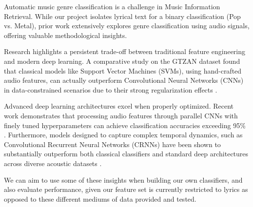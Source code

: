 Automatic music genre classification is a challenge in Music Information Retrieval. While our project isolates lyrical text for a binary classification (Pop vs. Metal), prior work extensively explores genre classification using audio signals, offering valuable methodological insights.

Research highlights a persistent trade-off between traditional feature engineering and modern deep learning. A comparative study on the GTZAN dataset found that classical models like Support Vector Machines (SVMs), using hand-crafted audio features, can actually outperform Convolutional Neural Networks (CNNs) in data-constrained scenarios due to their strong regularization effects \citep{mishra2025musicgenreclassificationusing}.

Advanced deep learning architectures excel when properly optimized. Recent work demonstrates that processing audio features through parallel CNNs with finely tuned hyperparameters can achieve classification accuracies exceeding 95\% \citep{LI2024e24892}. Furthermore, models designed to capture complex temporal dynamics, such as Convolutional Recurrent Neural Networks (CRNNs) have been shown to substantially outperform both classical classifiers and standard deep architectures across diverse acoustic datasets \citep{prajuli2026musicgenreclassificationcomparative}.

We can aim to use some of these insights when building our own classifiers, and also evaluate performance, given our feature set is currently restricted to lyrics as opposed to these different mediums of data provided and tested. 